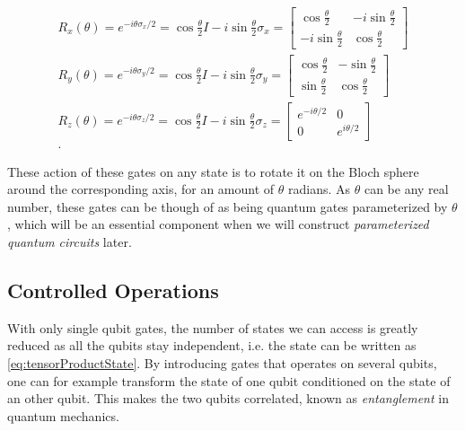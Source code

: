 \begin{equation}\label{eq:PauliRotations}
\begin{aligned}
    R_x(\theta) = e^{-i\theta\sigma_x/2} = \cos{\frac{\theta}{2}}I - i\sin{\frac{\theta}{2}}\sigma_x
    =
    \begin{bmatrix}
        \cos{\frac{\theta}{2}} & -i\sin{\frac{\theta}{2}} \\
        -i\sin{\frac{\theta}{2}} & \cos{\frac{\theta}{2}}
    \end{bmatrix}\\
    R_y(\theta) = e^{-i\theta\sigma_y/2} = \cos{\frac{\theta}{2}}I - i\sin{\frac{\theta}{2}}\sigma_y
    =
    \begin{bmatrix}
        \cos{\frac{\theta}{2}} & -\sin{\frac{\theta}{2}} \\
        \sin{\frac{\theta}{2}} & \cos{\frac{\theta}{2}}
    \end{bmatrix}\\
    R_z(\theta) = e^{-i\theta\sigma_z/2} = \cos{\frac{\theta}{2}}I - i\sin{\frac{\theta}{2}}\sigma_z
    =
    \begin{bmatrix}
        e^{-i\theta/2} & 0 \\
        0 & e^{i\theta/2}
    \end{bmatrix}\\.
\end{aligned}    
\end{equation}

These action of these gates on any state is to rotate it on the Bloch sphere around the corresponding axis, for an amount of $\theta$ radians. As $\theta$ can be any real number, these gates can be though of as being quantum gates parameterized by $\theta$, which will be an essential component when we will construct \emph{parameterized quantum circuits} later.  









\subsection{Controlled Operations}\label{sec:ControlledOperations}
With only single qubit gates, the number of states we can access is greatly reduced as all the qubits stay independent, i.e. the state can be written as \autoref{eq:tensorProductState}. By introducing gates that operates on several qubits, one can for example transform the state of one qubit conditioned on the state of an other qubit. This makes the two qubits correlated, known as \emph{entanglement} in quantum mechanics.

